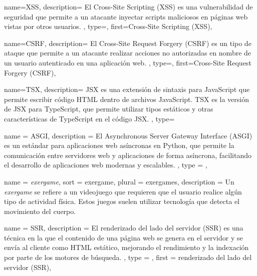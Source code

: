 {
    name={XSS},
    description={
        El Cross-Site Scripting (XSS) es una vulnerabilidad de seguridad que permite a un atacante
        inyectar scripts maliciosos en páginas web vistas por otros usuarios.
    },
    type=\acronymtype,
    first={Cross-Site Scripting (XSS)},
}

{
    name={CSRF},
    description={
        El Cross-Site Request Forgery (CSRF) es un tipo de ataque que permite a un atacante
        realizar acciones no autorizadas en nombre de un usuario autenticado en una aplicación web.
    },
    type=\acronymtype,
    first={Cross-Site Request Forgery (CSRF)},
}

{
    name={TSX},
    description={
        JSX es una extensión de sintaxis para JavaScript que permite escribir código HTML
        dentro de archivos JavaScript. TSX es la versión de JSX para TypeScript, que
        permite utilizar tipos estáticos y otras características de TypeScript en el código JSX.
    },
    type=\acronymtype
}

{
    name = {ASGI},
    description = {
        El Asynchronous Server Gateway Interface (ASGI) es un estándar para aplicaciones web
        asíncronas en Python, que permite la comunicación entre servidores web y aplicaciones
        de forma asíncrona, facilitando el desarrollo de aplicaciones web modernas y escalables.
    },
    type = \acronymtype,
}

{
    name = {\textit{exergame}},
    sort = {exergame},
    plural = {exergames},
    description = {
        Un \textit{exergame} se refiere a un videojuego que requieren que el usuario realice algún
        tipo de actividad física. Estos juegos suelen utilizar tecnología que detecta el movimiento
        del cuerpo.
    }
}

{
    name = {SSR},
    description = {
        El renderizado del lado del servidor (SSR) es una técnica en la que el contenido de una
        página web se genera en el servidor y se envía al cliente como HTML estático, mejorando
        el rendimiento y la indexación por parte de los motores de búsqueda.
    },
    type = \acronymtype,
    first = {renderizado del lado del servidor (SSR)},
}
